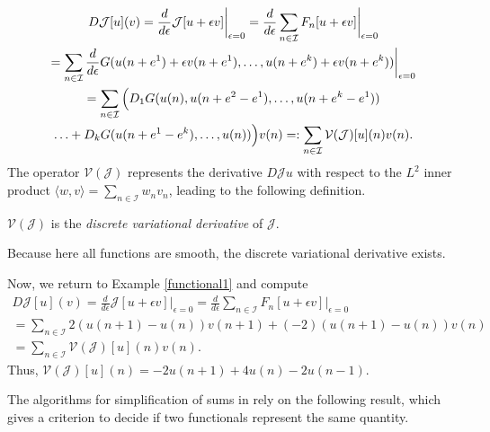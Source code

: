 \documentclass[runningheads]{llncs}
\newcommand{\1}{\chi}
\newcommand{\Ii}{\mathcal{I}}
\begin{document}
\begin{gather}
	\notag	D\mathcal{J}[u](v)=\frac{d}{d\epsilon}\mathcal{J}[u+\epsilon v]\bigg|_{\epsilon=0}=\frac{d}{d\epsilon}\sum_{n\in\Ii}F_n[u+\epsilon v]\bigg|_{\epsilon=0}\\
	\notag	=\sum_{n\in\Ii}\frac{d}{d\epsilon}G(u(n+e^1)+\epsilon v(n+e^1),\ldots,u(n+e^k)+\epsilon v(n+e^k))\bigg|_{\epsilon=0}\\
	\label{periodicity}	%
	\notag	=\sum_{n\in\Ii}\Big(D_1G(u(n),u(n+e^2-e^1),\ldots,u(n+e^k-e^1))\\
	\notag	\ldots+D_kG(u(n+e^1-e^k),\ldots,u(n))\Big)v(n)
=:\sum_{n\in\Ii}\mathcal{V}(\mathcal{J})[u](n)v(n).	
\end{gather}
The operator $\mathcal{V}(\mathcal{J})$ represents the derivative $D\mathcal{J}u$ with respect to the $L^2$ inner product $\langle w, v\rangle=\sum_{n\in \Ii} w_n v_n$, leading to the following definition.
\begin{definition}
	$\mathcal{V}(\mathcal{J})$ is the \emph{discrete variational derivative} of $\mathcal{J}$.
\end{definition}
Because here all functions are smooth, the discrete variational derivative exists.
\begin{example}
Now, we return to Example \ref{functional1} and compute
	\begin{gather*}
		D\mathcal{J}[u](v)=\frac{d}{d\epsilon}\mathcal{J}[u+\epsilon v]\bigg|_{\epsilon=0}=\frac{d}{d\epsilon}\sum_{n\in\Ii}F_n[u+\epsilon v]\bigg|_{\epsilon=0}\\
		=\sum_{n\in\Ii}2(u(n+1)-u(n))v(n+1)+(-2)(u(n+1)-u(n))v(n)\\
		=\sum_{n\in\Ii}\mathcal{V}(\mathcal{J})[u](n)v(n).
	\end{gather*}
Thus, $\mathcal{V}(\mathcal{J})[u](n)=-2u(n+1)+4u(n)-2u(n-1)$.
\end{example}
The algorithms for simplification of sums in \cite{gomes20} rely on the following result, which 
gives a criterion to decide if two functionals represent the same quantity.
\end{document}
